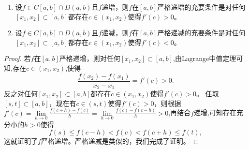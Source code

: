 \documentclass[../../main.tex]{subfiles}%
\begin{document}
\begin{theorem}[严格单调和导数的关系]\label{theorem:严格单调和导数的关系}
\begin{enumerate}
\item 设\(f\in C[a,b]\cap D(a,b)\)且\(f\)递增，则\(f\)在\([a,b]\)严格递增的充要条件是对任何\([x_1,x_2]\subset [a,b]\)都存在\(c\in(x_1,x_2)\)使得\(f'(c)>0\)。

\item 设\(f\in C[a,b]\cap D(a,b)\)且\(f\)递减，则\(f\)在\([a,b]\)严格递减的充要条件是对任何\([x_1,x_2]\subset [a,b]\)都存在\(c\in(x_1,x_2)\)使得\(f'(c)<0\)。
\end{enumerate}
\end{theorem}
\begin{proof}
若\(f\)在\([a,b]\)严格递增，则对任何\([x_1,x_2]\subset [a,b]\),由Lagrange中值定理可知,存在\(c\in(x_1,x_2)\),使得
\[
\frac{f(x_2)-f(x_1)}{x_2 - x_1}=f'(c)>0.
\]
反之对任何\([x_1,x_2]\subset [a,b]\)都存在\(c\in(x_1,x_2)\)使得\(f'(c)>0\)。
任取\([s,t]\subset [a,b]\)，现在有\(c\in(s,t)\)使得\(f'(c)>0\)，则根据$f'\left( c \right) =\underset{h\rightarrow 0}{\lim}\frac{f\left( c+h \right) -f\left( c \right)}{h}=\underset{h\rightarrow 0}{\lim}\frac{f\left( c \right) -f\left( c-h \right)}{h}>0$,再结合$f$递增,可知存在充分小的\(h > 0\)使得
\[
f(s)\leqslant f(c - h)<f(c)<f(c + h)\leqslant f(t),
\]
这就证明了\(f\)严格递增。严格递减是类似的，我们完成了证明。
\end{proof}
\end{document}
